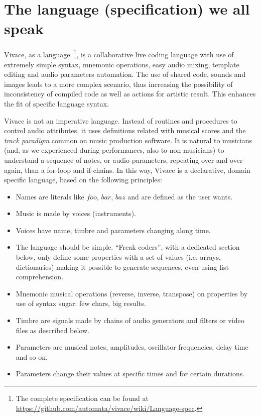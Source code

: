 \documentclass[letterpaper, 12pt]{article}
\begin{document}
\section{The language (specification) we all speak}

Vivace, as a language~\footnote{The complete specification
  can be found at
  \url{https://github.com/automata/vivace/wiki/Language-spec}.}, is a
collaborative live coding language with use of extremely simple syntax,
mnemonic operations, easy audio mixing, template editing and audio
parameters automation. The use of shared code, sounds and images leads
to a more complex scenario, thus increasing the possibility of
inconsistency of compiled code as well as actions for artistic
result. This enhances the fit of specific language syntax.

Vivace is not an imperative language. Instead of routines and
procedures to control audio attributes, it uses definitions related
with musical scores and the \emph{track paradigm} common on music
production software. It is natural to musicians (and, as we
experienced during performances, also to non-musicians) to understand
a sequence of notes, or audio parameters, repeating over and over
again, than a for-loop and if-chains. In this way, Vivace is a
declarative, domain specific language, based on the following
principles:

\begin{itemize}
  
\item Names are literals like $foo$, $bar$, $baz$ and are defined as
  the user wants.
\item Music is made by voices (instruments).
\item Voices have name, timbre and parameters changing along time.
\item The language should be simple. ``Freak coders'', with a
  dedicated section below, only define some properties with a set of
  values (i.e. arrays, dictionaries) making it possible to generate
  sequences, even using list comprehension.
\item Mnemonic musical operations (reverse, inverse, transpose) on
  properties by use of syntax sugar: few chars, big results.
\item Timbre are signals made by chains of audio generators and
  filters or video files as described below.
\item Parameters are musical notes, amplitudes, oscillator frequencies,
  delay time and so on.
\item Parameters change their values at specific times and for certain durations.
\end{itemize}
\end{document}
